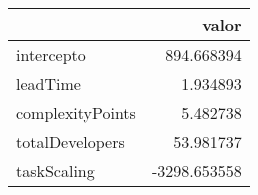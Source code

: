 \begin{tabular}{lr}
\toprule
{} &        valor \\
\midrule
intercepto       &   894.668394 \\
leadTime         &     1.934893 \\
complexityPoints &     5.482738 \\
totalDevelopers  &    53.981737 \\
taskScaling      & -3298.653558 \\
\bottomrule
\end{tabular}
